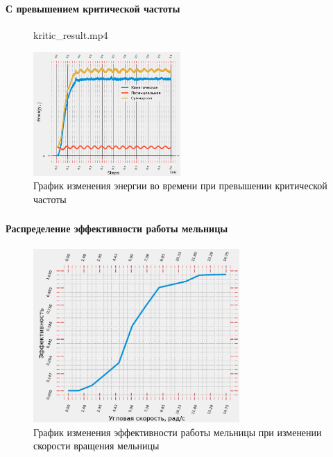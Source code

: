 \documentclass[c]{beamer}  %
\begin{document}
\begin{frame}
\frametitle{\insertsection} 
\framesubtitle{С превышением критической частоты}
\begin{figure}[ht]
     		{kritic_result.mp4}
\end{figure}
\begin{figure}[H]
	\centering
	\includegraphics[width=0.5\textwidth]{kritic_energy} 
	\caption{График изменения энергии во времени при превышении критической частоты}
\end{figure}
\end{frame}



\begin{frame}
\frametitle{\insertsection} 
\framesubtitle{Распределение эффективности работы мельницы}
\begin{figure}[H]
	\centering
	\includegraphics[width=0.7\textwidth]{efficiency} 
	\caption{График изменения эффективности работы мельницы при изменении скорости вращения мельницы}
	\label{pic:efficiency}
\end{figure} 
\end{frame}
\end{document}
